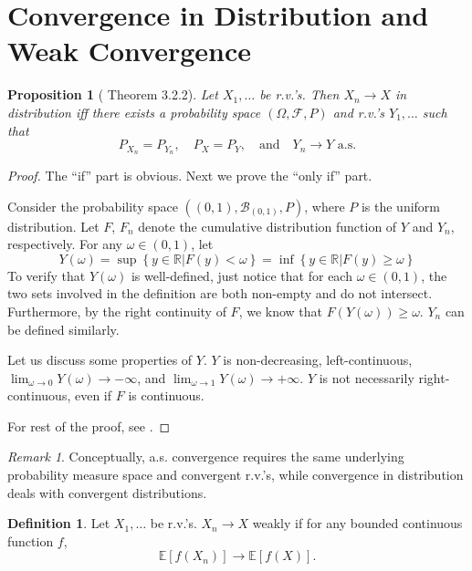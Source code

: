 \documentclass[openany]{book}
\newtheorem{proposition}{Proposition}[chapter]
\theoremstyle{definition}
\newtheorem{definition}{Definition}[chapter]
\theoremstyle{remark}
\newtheorem*{remark}{Remark}
\begin{document}
\section{Convergence in Distribution and Weak Convergence}
\begin{proposition}[\cite{D10} Theorem 3.2.2]
    Let $X_1,\ldots$ be r.v.'s. Then $X_n\to X$ in distribution iff there exists a probability space $(\Omega,\mathcal{F},P)$ and r.v.'s $Y_1,\ldots$ such that
    \begin{equation*}
        P_{X_n}=P_{Y_n},\quad P_X=P_Y,\quad\textrm{and}\quad Y_n\to Y\textrm{ a.s.}
    \end{equation*}
\end{proposition}
\begin{proof}
    The ``if'' part is obvious. Next we prove the ``only if'' part.

    Consider the probability space $\left((0,1),\mathcal{B}_{(0,1)},P\right)$, where $P$ is the uniform distribution. Let $F$, $F_n$ denote the cumulative distribution function of $Y$ and $Y_n$, respectively. For any $\omega\in(0,1)$, let
    \begin{equation*}
        Y(\omega)=\sup\left\{y\in \mathbb{R}|F(y)<\omega\right\}=\inf\left\{y\in \mathbb{R}|F(y)\ge\omega\right\}
    \end{equation*}
    To verify that $Y(\omega)$ is well-defined, just notice that for each $\omega\in(0,1)$, the two sets involved in the definition are both non-empty and do not intersect. Furthermore, by the right continuity of $F$, we know that $F\left(Y(\omega)\right)\ge\omega$. $Y_n$ can be defined similarly.

    Let us discuss some properties of $Y$. $Y$ is non-decreasing, left-continuous, $\lim_{\omega\to0}Y(\omega)\to-\infty$, and $\lim_{\omega\to1}Y(\omega)\to+\infty$. $Y$ is not necessarily right-continuous, even if $F$ is continuous.

    For rest of the proof, see \cite{D10}.
\end{proof}
\begin{remark}
    Conceptually, a.s. convergence requires the same underlying probability measure space and convergent r.v.'s, while convergence in distribution deals with convergent distributions.
\end{remark}
\begin{definition}
    Let $X_1,\ldots$ be r.v.'s. $X_n\to X$ weakly if for any bounded continuous function $f$,
    \begin{equation*}
        \mathbb{E}\left[f(X_n)\right]\to \mathbb{E}\left[f(X)\right].
    \end{equation*}
\end{definition}
\end{document}
